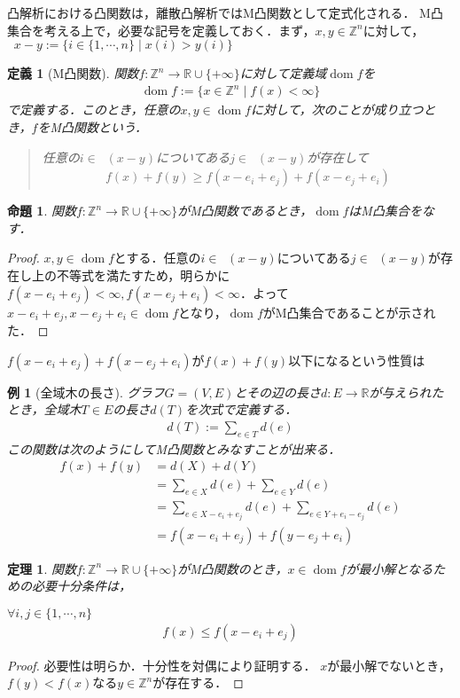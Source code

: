 \documentclass[uplatex]{jsarticle}
\newcommand{\Int}{\mathbb{Z}}
\DeclareMathOperator{\suppplus}{\mathrm{supp}^{+}}
\DeclareMathOperator{\suppminus}{\mathrm{supp}^{-}}
\DeclareMathOperator{\dom}{\mathrm{dom}}
\theoremstyle{break}
\newtheorem{theo}{定理}[section]
\newtheorem{defi}{定義}[section]
\newtheorem{prop}{命題}[section]
\newtheorem{proof}{証明}[section]
\newtheorem{example}{例}[section]
\begin{document}
凸解析における凸関数は，離散凸解析ではM凸関数として定式化される．
M凸集合を考える上で，必要な記号を定義しておく．まず，$x,y\in \Int^n$に対して，$\suppplus{x-y} := \{ i \in \{1,\cdots,n\} \mid x(i) > y(i) \}$
\begin{defi}[M凸関数]
  関数$f\colon \Int^n \to \mathbb{R}\cup \{+\infty\}$に対して定義域$\dom f$を
  \begin{align*}
    \dom f := \{ x \in \Int^n \mid f(x) < \infty \}
  \end{align*}
  で定義する．このとき，任意の$x,y\in \dom f$に対して，次のことが成り立つとき，$f$をM凸関数という．
  \begin{quote}
    任意の$i \in \suppplus(x-y)$についてある$j \in \suppminus(x-y)$が存在して
    \begin{align*}
      f(x) + f(y) \geq f(x-e_i+e_j) + f(x-e_j+e_i)
    \end{align*}   
  \end{quote}
\end{defi}
\begin{prop}
  関数$f\colon \Int^n \to \mathbb{R}\cup \{+\infty\}$がM凸関数であるとき，$\dom f$はM凸集合をなす．
\end{prop}
\begin{proof}
  $x,y\in \dom f$とする．任意の$i\in \suppplus(x-y)$についてある$j\in \suppminus(x-y)$が存在し上の不等式を満たすため，明らかに$f(x-e_i+e_j)<\infty ,f(x-e_j+e_i)<\infty$．よって$x-e_i+e_j,x-e_j+e_i\in \dom f$となり，$\dom f$がM凸集合であることが示された．
\end{proof}
$f(x-e_i+e_j) + f(x-e_j+e_i)$が$f(x)+f(y)$以下になるという性質は
\begin{example}[全域木の長さ] 
  グラフ$G=(V,E)$とその辺の長さ$d\colon E \to \mathbb{R}$が与えられたとき，全域木$T\in E$の長さ$d(T)$を次式で定義する．
  \begin{align*}
    d(T) := \sum_{e\in T} d(e)
  \end{align*}
  この関数は次のようにしてM凸関数とみなすことが出来る．
  \begin{align*}
    f(x) + f(y) & = d(X)+d(Y) \\
                & = \sum_{e\in X}d(e) + \sum_{e\in Y}d(e)  \\
                & = \sum_{e\in X-e_i+e_j}d(e) + \sum_{e\in Y+e_i-e_j}d(e)  \\
                & = f(x-e_i+e_j) + f(y-e_j+e_i)
  \end{align*}
\end{example}
\begin{theo}
  関数$f\colon \Int^n \to \mathbb{R} \cup \{+\infty\} $がM凸関数のとき，$x\in \dom f$が最小解となるための必要十分条件は，

  $\forall  i, j \in \{ 1, \cdots , n \}$
  \begin{align*}
    f(x) \leq f(x-e_i + e_j)
  \end{align*}
\end{theo}
\begin{proof}
  必要性は明らか．十分性を対偶により証明する．
  $x$が最小解でないとき，$f(y) < f(x)$なる$y\in \Int^n$が存在する．
\end{proof}
\end{document}

